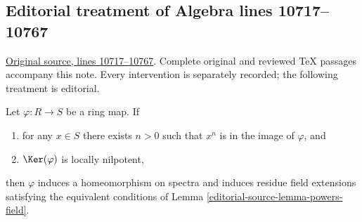 \subsection{Editorial treatment of Algebra lines 10717--10767}

\hypertarget{algebra-context-127}{}

\noindent\href{https://github.com/stacks/stacks-project/blob/a04446e57ec1fbc252a871afcec7752fb2807b14/algebra.tex\#L10717}{Original source, lines 10717--10767}. Complete original and reviewed TeX passages accompany this note. Every intervention is separately recorded; the following treatment is editorial.


\begin{lemma}
\label{editorial-source-lemma-powers}
Let $\varphi : R \to S$ be a ring map. If
\begin{enumerate}
\item for any $x \in S$ there exists $n > 0$ such that
$x^n$ is in the image of $\varphi$, and
\item $\Ker(\varphi)$ is locally nilpotent,
\end{enumerate}
then $\varphi$ induces a homeomorphism on spectra and induces residue
field extensions satisfying the equivalent conditions of
Lemma \ref{editorial-source-lemma-powers-field}.
\end{lemma}


